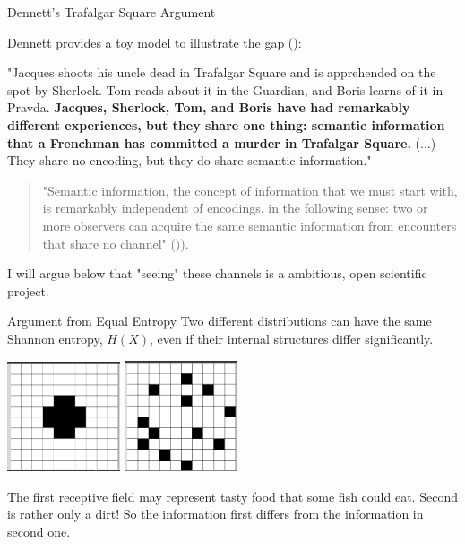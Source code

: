 \documentclass[10pt, aspectratio=169]{beamer}
\begin{document}
\begin{frame}{Dennett's Trafalgar Square Argument}
    
    Dennett provides a toy model to illustrate the gap (\cite{dennett_bacteria_2017}): 
    
    "Jacques shoots his uncle dead in Trafalgar Square and is apprehended on the spot by Sherlock. Tom reads about it in the Guardian, and Boris learns of it in Pravda.\textbf{ Jacques, Sherlock, Tom, and Boris have had remarkably different experiences, but they share one thing: semantic information that a Frenchman has committed a murder in Trafalgar Square.} (...) They share no encoding, but they do share semantic information."

    \bigskip
    
    \begin{quote}
    "Semantic information, the concept of information that we must start with, is remarkably independent of encodings, in the following sense: two or more observers can acquire the same semantic information from encounters that share no channel" ()\cite{dennett_bacteria_2017}). 
    \end{quote}

    I will argue below that "seeing" these channels is a ambitious, open scientific project.

\end{frame}






\begin{frame}{Argument from Equal Entropy}
  Two different distributions can have the same Shannon entropy, $H(X)$, even if their internal structures differ significantly. 

\begin{center}
    \includegraphics[width=0.25\textwidth]{images/entropia_1.png}
    \includegraphics[width=0.25\textwidth]{images/entropia_2.png}
\end{center}
   The first receptive field may represent tasty food that some  fish could eat. Second is rather only a dirt! So the information first differs from the information in second one.
\end{frame}
\end{document}
